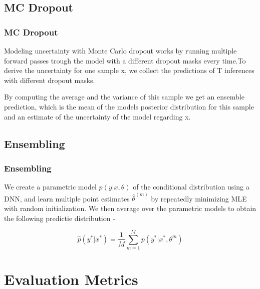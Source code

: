 \documentclass{beamer}
\begin{document}
\subsection{MC Dropout}
\begin{frame}
\frametitle{MC Dropout}

\hspace{0.3cm} Modeling uncertainty with Monte Carlo dropout works by running multiple forward passes trough the model with a different dropout masks every time.To derive the uncertainty for one sample x, we collect the predictions of T inferences with different dropout masks.

\vspace{0.3cm}

\hspace{0.3cm} By computing the average and the variance of this sample we get an ensemble prediction, which is the mean of the models posterior distribution for this sample and an estimate of the uncertainty of the model regarding x.

\end{frame}

\subsection{Ensembling}
\begin{frame}
\frametitle{Ensembling}

We create a parametric model $p(y|x,\theta)$ of the conditional distribution using a DNN, and learn multiple point estimates $\hat{\theta}^{(m)}$ by repeatedly minimizing MLE with random initialization. We then average over the parametric models to obtain the following predictie distribution - 

\begin{equation}
    \hat{p} (y^*|x^*) = \frac{1}{M} \sum_{m=1}^{M} p(y^* | x^*, \theta^{m})
\end{equation}

\end{frame}


\section{Evaluation Metrics}
\end{document}
